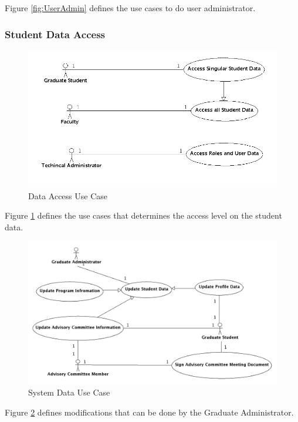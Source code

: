\documentclass{journal}
\begin{document}
Figure \ref{fig:UserAdmin} defines the use cases to do user administrator. 

\subsubsection{Student Data Access}
\begin{figure}[htp]
\centering
\includegraphics[scale=0.5]{diagrams/use_cases/access_uc.png}
\caption{Data Access Use Case}
\label{fig:UserAccess}
\end{figure}

Figure \ref{fig:UserAccess} defines the use cases that determines the access level on the student data.

\begin{figure}[htp]
\centering
\includegraphics[scale=0.25]{diagrams/use_cases/system_data_uc.png}
\caption{System Data Use Case}
\label{fig:SystemData}
\end{figure}

Figure \ref{fig:SystemData} defines modifications that can be done by the Graduate Administrator. 
\end{document}
